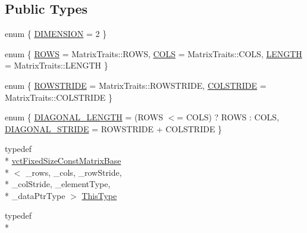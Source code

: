 \subsection*{Public Types}
\begin{DoxyCompactItemize}
\item 
enum \{ \hyperlink{classvct_fixed_size_const_matrix_base_ab96748397b9d0700e8c892b7700c29b3a8f93683e9a4da14eb3a7005b19ad135f}{D\-I\-M\-E\-N\-S\-I\-O\-N} = 2
 \}
\item 
enum \{ \hyperlink{classvct_fixed_size_const_matrix_base_a05da4a844e1880e31d3052abb9a8063ba628eeb65016492a84b40dad539262735}{R\-O\-W\-S} = Matrix\-Traits\-:\-:R\-O\-W\-S, 
\hyperlink{classvct_fixed_size_const_matrix_base_a05da4a844e1880e31d3052abb9a8063ba99583531bd0415ad92eed81fc931d592}{C\-O\-L\-S} = Matrix\-Traits\-:\-:C\-O\-L\-S, 
\hyperlink{classvct_fixed_size_const_matrix_base_a05da4a844e1880e31d3052abb9a8063ba3a9b8b3d119455a4b5f4a6553a707f92}{L\-E\-N\-G\-T\-H} = Matrix\-Traits\-:\-:L\-E\-N\-G\-T\-H
 \}
\item 
enum \{ \hyperlink{classvct_fixed_size_const_matrix_base_a0aa9b864b8810dd6a50640c965564bd0a1249f054e777d0972eee94e9e33c3f4f}{R\-O\-W\-S\-T\-R\-I\-D\-E} = Matrix\-Traits\-:\-:R\-O\-W\-S\-T\-R\-I\-D\-E, 
\hyperlink{classvct_fixed_size_const_matrix_base_a0aa9b864b8810dd6a50640c965564bd0aee4513ad3dee685fdda1bc2c264be993}{C\-O\-L\-S\-T\-R\-I\-D\-E} = Matrix\-Traits\-:\-:C\-O\-L\-S\-T\-R\-I\-D\-E
 \}
\item 
enum \{ \hyperlink{classvct_fixed_size_const_matrix_base_ad4ad7a7ed23628b65949dbbf56d388f4ab8ef0428d870c5a6319df40288a7f43d}{D\-I\-A\-G\-O\-N\-A\-L\-\_\-\-L\-E\-N\-G\-T\-H} = (R\-O\-W\-S $<$= C\-O\-L\-S) ? R\-O\-W\-S \-: C\-O\-L\-S, 
\hyperlink{classvct_fixed_size_const_matrix_base_ad4ad7a7ed23628b65949dbbf56d388f4aa23755b132b8c416884bd2e751ea69ca}{D\-I\-A\-G\-O\-N\-A\-L\-\_\-\-S\-T\-R\-I\-D\-E} = R\-O\-W\-S\-T\-R\-I\-D\-E + C\-O\-L\-S\-T\-R\-I\-D\-E
 \}
\item 
typedef \\*
\hyperlink{classvct_fixed_size_const_matrix_base}{vct\-Fixed\-Size\-Const\-Matrix\-Base}\\*
$<$ \-\_\-rows, \-\_\-cols, \-\_\-row\-Stride, \\*
\-\_\-col\-Stride, \-\_\-element\-Type, \\*
\-\_\-data\-Ptr\-Type $>$ \hyperlink{classvct_fixed_size_const_matrix_base_a7ec66a96ed7e08ce9ff54093133c9d8d}{This\-Type}
\item 
typedef \\*

\end{DoxyCompactItemize}
